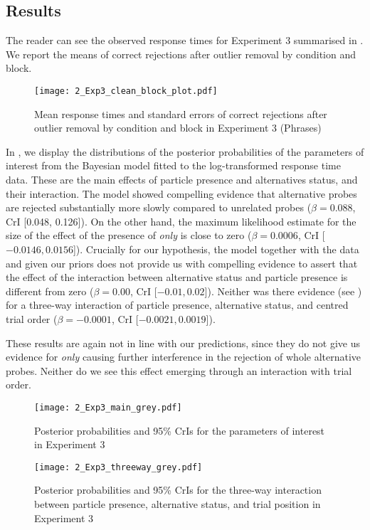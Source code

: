 \documentclass[output=paper,colorlinks,citecolor=brown]{langscibook}
\begin{document}
\subsection{Results}

The reader can see the observed response times for Experiment 3 summarised in . We report the means of correct rejections after outlier removal by condition and block.

\begin{figure}
\texttt{[image: 2\_Exp3\_clean\_block\_plot.pdf]}
\caption{Mean response times and standard errors of correct rejections after outlier removal by condition and block in Experiment 3 (Phrases)}
\label{fig:fig5}
\end{figure}

In , we display the distributions of the posterior probabilities of the parameters of interest from the Bayesian model fitted to the log-transformed response time data. These are the main effects of particle presence and alternatives status, and their interaction. The model showed compelling evidence that alternative probes are rejected substantially more slowly compared to unrelated probes ($\beta = 0.088$, CrI [0.048, 0.126]). On the other hand, the maximum likelihood estimate for the size of the effect of the presence of \textit{only} is close to zero ($\beta = 0.0006$, CrI [$-0.0146, 0.0156$]). Crucially for our hypothesis, the model together with the data and given our priors does not provide us with compelling evidence to assert that the effect of the interaction between alternative status and particle presence is different from zero ($\beta = 0.00$, CrI [$-0.01, 0.02$]). Neither was there evidence (see ) for a three-way interaction of particle presence, alternative status, and centred trial order ($\beta = -0.0001$, CrI [$-0.0021, 0.0019$]).

These results are again not in line with our predictions, since they do not give us evidence for \textit{only} causing further interference in the rejection of whole alternative probes. Neither do we see this effect emerging through an interaction with trial order.

\begin{figure}[p]
\texttt{[image: 2\_Exp3\_main\_grey.pdf]}
\caption{Posterior probabilities and 95\% CrIs for the parameters of interest in Experiment 3}
\label{fig:fig6}
\end{figure}

\begin{figure}[p]
\texttt{[image: 2\_Exp3\_threeway\_grey.pdf]}
\caption{Posterior probabilities and 95\% CrIs for the three-way interaction between particle presence, alternative status, and trial position in Experiment 3}
\label{fig:fig7}
\end{figure}
\clearpage
\end{document}
